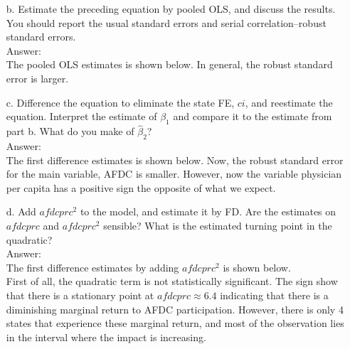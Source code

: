 \documentclass[10pt]{article}
\begin{document}
\begin{enumerate}
\item[b.] Estimate the preceding equation by pooled OLS, and discuss the results. You should report the usual standard errors and serial correlation–robust standard errors. 
\\ Answer: \\
The pooled OLS estimates is shown below. In general, the robust standard error is larger.
\\ 


\item[c.] Difference the equation to eliminate the state FE, $ci$, and reestimate the equation. Interpret the estimate of $\beta_1$ and compare it to the estimate from part b. What do you make of $\hat{\beta}_2$? \\ Answer: \\
The first difference estimates is shown below. Now, the robust standard error for the main variable, AFDC is smaller. However, now the variable physician per capita has a positive sign the opposite of what we expect.
\\ 


\item[d.] Add $afdcprc^2$ to the model, and estimate it by FD. Are the estimates on $afdcprc$ and $afdcprc^2$ sensible? What is the estimated turning point in the quadratic?
\\ Answer: \\
The first difference estimates by adding $afdcprc^2$ is shown below.
\\ 
First of all, the quadratic term is not statistically significant. The sign show that there is a stationary point at $afdcprc\approx 6.4$ indicating that there is a diminishing marginal return to AFDC participation. However, there is only 4 states that experience these marginal return, and most of the observation lies in the interval where the impact is increasing. 

\end{enumerate}
\end{document}
